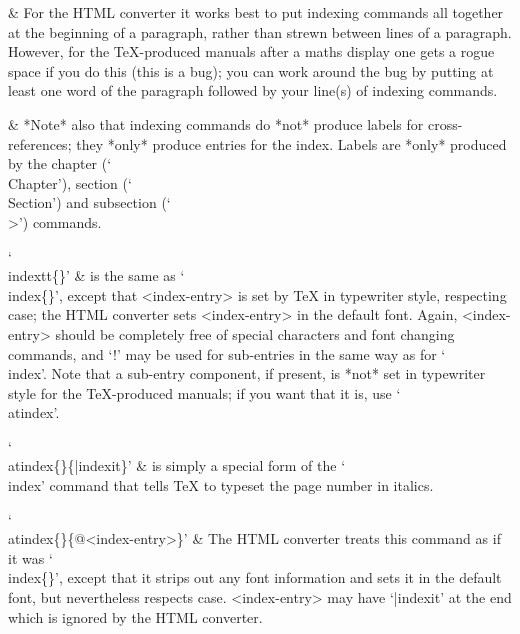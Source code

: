   & For the HTML converter it works best to  put  indexing  commands  all
    together at the beginning of a paragraph, rather than strewn  between
    lines of a paragraph. However, for the {\TeX}-produced manuals  after
    a maths display one gets a rogue space if you  do  this  (this  is  a
    bug); you can work around the bug by putting at least one word of the
    paragraph followed by your line(s) of indexing commands.

  & *Note* also that  indexing  commands  do  *not*  produce  labels  for
    cross-references; they *only* produce entries for the  index.  Labels
    are  *only*  produced   by   the   chapter   (`\\Chapter'),   section
    (`\\Section') and subsection (`\\>') commands.

`\\indextt\{<index-entry>\}' &
    is the same as `\\index\{<index-entry>\}', except that  <index-entry>
    is set by {\TeX} in  typewriter  style,  respecting  case;  the  HTML
    converter  sets   <index-entry>   in   the   default   font.   Again,
    <index-entry> should be completely free  of  special  characters  and
    font changing commands, and `!' may be used for  sub-entries  in  the
    same way as for  `\\index'.  Note  that  a  sub-entry  component,  if
    present, is *not* set in typewriter  style  for  the  {\TeX}-produced
    manuals; if you want that it is, use `\\atindex'.

`\\atindex\{<sort-entry>\}\{|indexit\}' &
    is simply a special form of the `\\index' command that  tells  {\TeX}
    to typeset the page number in italics.

`\\atindex\{<sort-entry>\}\{@<index-entry>\}' &
    The   HTML   converter   treats   this   command   as   if   it   was
    `\\index\{<index-entry>\}',  except  that  it  strips  out  any  font
    information and  sets  it  in  the  default  font,  but  nevertheless
    respects case. <index-entry> may have `|indexit' at the end which is
    ignored by the HTML converter.

